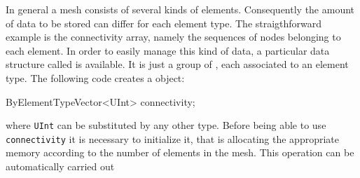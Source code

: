 In general a mesh consists of several kinds of elements. Consequently the 
amount of data to be stored can differ for each element type. The straigthforward 
example is the connectivity array, namely the sequences of nodes belonging to
each element. In order to easily manage this kind of data, a
particular data structure called  is available. 
It is just a group of , each associated to an element
type. The following code creates a 
object:
\begin{cpp}
  ByElementTypeVector<UInt> connectivity;
\end{cpp}
where \texttt{UInt} can be substituted by any other type. 
Before being able to use \texttt{connectivity} it is
necessary to initialize it, that is allocating the appropriate memory
according to the number of elements in the mesh. This operation can be
automatically carried out
